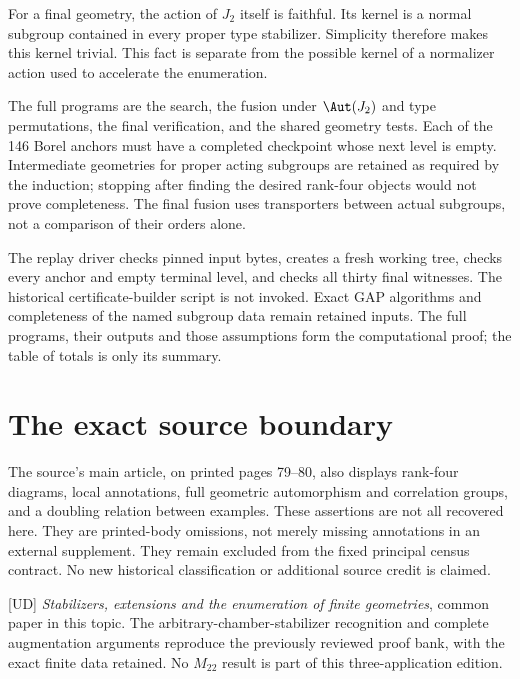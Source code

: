 For a final geometry, the action of $J_2$ itself is faithful. Its kernel is
a normal subgroup contained in every proper type stabilizer. Simplicity
therefore makes this kernel trivial. This fact is separate from the possible
kernel of a normalizer action used to accelerate the enumeration.

The full programs are the search, the fusion under $\Aut(J_2)$ and type
permutations, the final verification, and the shared geometry tests. Each
of the 146 Borel anchors must have a completed checkpoint whose next level
is empty. Intermediate geometries for proper acting subgroups are retained
as required by the induction; stopping after finding the desired rank-four
objects would not prove completeness. The final fusion uses transporters
between actual subgroups, not a comparison of their orders alone.

The replay driver checks pinned input bytes, creates a fresh working tree,
checks every anchor and empty terminal level, and checks all thirty final
witnesses. The historical certificate-builder script is not invoked. Exact
GAP algorithms and completeness of the named subgroup data remain retained
inputs. The full programs, their outputs and those assumptions form the
computational proof; the table of totals is only its summary.

\section{The exact source boundary}
The source's main article, on printed pages 79--80, also displays rank-four
diagrams, local annotations, full geometric automorphism and correlation
groups, and a doubling relation between examples. These assertions are not
all recovered here. They are printed-body omissions, not merely missing
annotations in an external supplement. They remain excluded from the fixed
principal census contract. No new historical classification or additional
source credit is claimed.

[UD] \emph{Stabilizers, extensions and the enumeration of finite geometries},
common paper in this topic. The arbitrary-chamber-stabilizer recognition and
complete augmentation arguments reproduce the previously reviewed proof
bank, with the exact finite data retained. No $M_{22}$ result is part of this
three-application edition.

